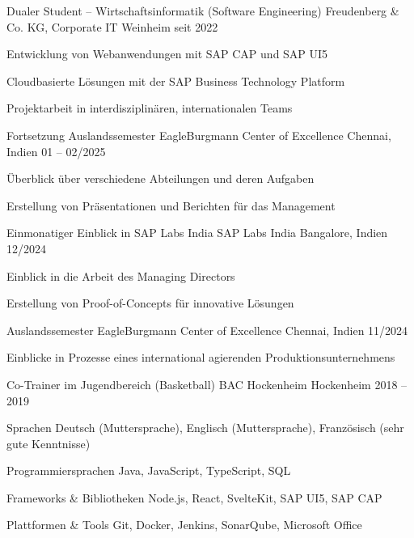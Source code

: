 \documentclass[11pt, a4paper]{awesome-cv}
\begin{document}
\begin{cventries}

\cventry
  {Dualer Student – Wirtschaftsinformatik (Software Engineering)}
  {Freudenberg \& Co. KG, Corporate IT}
  {Weinheim}
  {seit 2022}
  {
    \begin{cvitems}
      \item {Entwicklung von Webanwendungen mit SAP CAP und SAP UI5}
      \item {Cloudbasierte Lösungen mit der SAP Business Technology Platform}
      \item {Projektarbeit in interdisziplinären, internationalen Teams}
    \end{cvitems}
  }

\cventry
  {Fortsetzung Auslandssemester}
  {EagleBurgmann Center of Excellence}
  {Chennai, Indien}
  {01 -- 02/2025}
  {
    \begin{cvitems}
      \item {Überblick über verschiedene Abteilungen und deren Aufgaben}
      \item {Erstellung von Präsentationen und Berichten für das Management}
    \end{cvitems}
  }

\cventry
  {Einmonatiger Einblick in SAP Labs India}
  {SAP Labs India}
  {Bangalore, Indien}
  {12/2024}
  {
    \begin{cvitems}
      \item {Einblick in die Arbeit des Managing Directors}
      \item {Erstellung von Proof-of-Concepts für innovative Lösungen}
    \end{cvitems}
  }

\cventry
  {Auslandssemester}
  {EagleBurgmann Center of Excellence}
  {Chennai, Indien}
  {11/2024}
  {
    \begin{cvitems}
      \item {Einblicke in Prozesse eines international agierenden Produktionsunternehmens}
    \end{cvitems}
  }

\cventry
  {Co-Trainer im Jugendbereich (Basketball)}
  {BAC Hockenheim}
  {Hockenheim}
  {2018 -- 2019}
  {}

\end{cventries}


\begin{cvskills}

\cvskill
{Sprachen}
{Deutsch (Muttersprache), Englisch (Muttersprache), Französisch (sehr gute Kenntnisse)}

\cvskill
{Programmiersprachen}
{Java, JavaScript, TypeScript, SQL}

\cvskill
{Frameworks \& Bibliotheken}
{Node.js, React, SvelteKit, SAP UI5, SAP CAP}

\cvskill
{Plattformen \& Tools}
{Git, Docker, Jenkins, SonarQube, Microsoft Office}

\end{cvskills}
\end{document}
